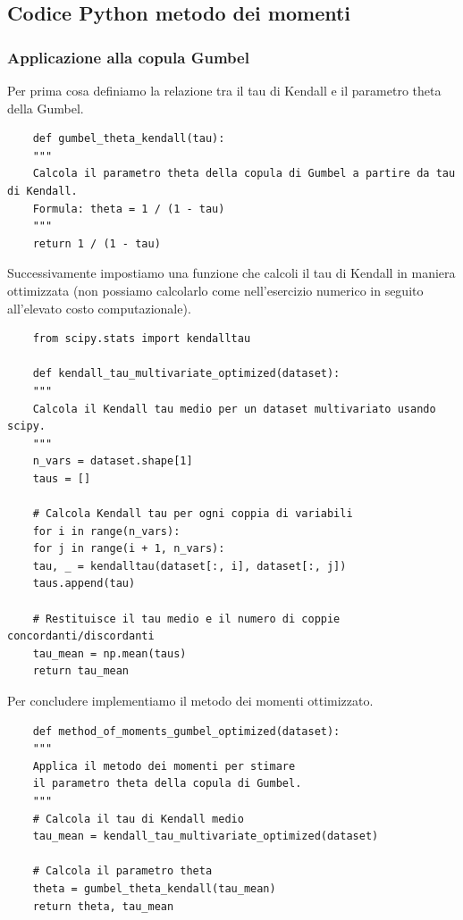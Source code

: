 \documentclass[%
	corpo=11pt,
    twoside,
    stile=classica,
    oldstyle,
    tipotesi=custom,
    greek,
    evenboxes,
]{toptesi}
\begin{document}
\subsection{Codice Python metodo dei momenti}

\subsubsection{Applicazione alla copula Gumbel}

Per prima cosa definiamo la relazione tra il tau di Kendall e il parametro theta della Gumbel.

\begin{verbatim}
	def gumbel_theta_kendall(tau):
	"""
	Calcola il parametro theta della copula di Gumbel a partire da tau di Kendall.
	Formula: theta = 1 / (1 - tau)
	"""
	return 1 / (1 - tau)
\end{verbatim}

Successivamente impostiamo una funzione che calcoli il tau di Kendall in maniera ottimizzata (non possiamo calcolarlo come nell'esercizio numerico in seguito all'elevato costo computazionale).

\begin{Verbatim}
	from scipy.stats import kendalltau
	
	def kendall_tau_multivariate_optimized(dataset):
	"""
	Calcola il Kendall tau medio per un dataset multivariato usando scipy.
	"""
	n_vars = dataset.shape[1]
	taus = []
	
	# Calcola Kendall tau per ogni coppia di variabili
	for i in range(n_vars):
	for j in range(i + 1, n_vars):
	tau, _ = kendalltau(dataset[:, i], dataset[:, j])
	taus.append(tau)
	
	# Restituisce il tau medio e il numero di coppie concordanti/discordanti
	tau_mean = np.mean(taus)
	return tau_mean
\end{Verbatim}

Per concludere implementiamo il metodo dei momenti ottimizzato.

\begin{Verbatim}
	def method_of_moments_gumbel_optimized(dataset):
	"""
	Applica il metodo dei momenti per stimare
	il parametro theta della copula di Gumbel.
	"""
	# Calcola il tau di Kendall medio
	tau_mean = kendall_tau_multivariate_optimized(dataset)
	
	# Calcola il parametro theta
	theta = gumbel_theta_kendall(tau_mean)
	return theta, tau_mean
\end{Verbatim}
\end{document}
